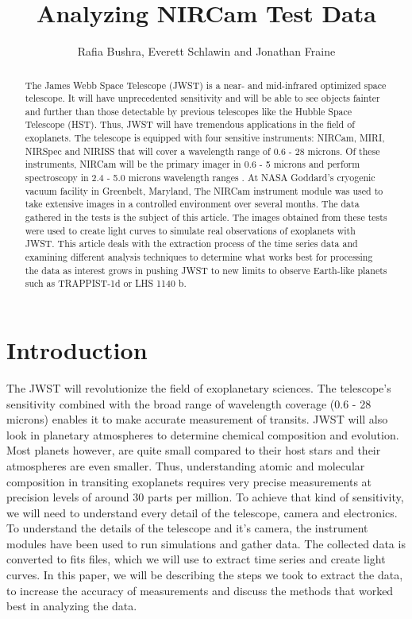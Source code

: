 \documentclass{aastex6}
\begin{document}
\title{Analyzing NIRCam Test Data}
\author{Rafia Bushra, Everett Schlawin and Jonathan Fraine}



\begin{abstract}
The James Webb Space Telescope (JWST) is a near- and mid-infrared optimized space telescope. It will have unprecedented sensitivity and will be able to see objects fainter and further than those detectable by previous telescopes like the Hubble Space Telescope (HST). Thus, JWST will have tremendous applications in the field of exoplanets. The telescope is equipped with four sensitive instruments: NIRCam, MIRI, NIRSpec and NIRISS that will cover a wavelength range of 0.6 - 28 microns. Of these instruments, NIRCam will be the primary imager in 0.6 - 5 microns and perform spectroscopy in 2.4 - 5.0 microns wavelength ranges . At NASA Goddard’s cryogenic vacuum facility in Greenbelt, Maryland, The NIRCam instrument module was used to take extensive images in a controlled environment over several months. The data gathered in the tests is the subject of this article. The images obtained from these tests were used to create light curves to simulate  real observations of exoplanets with JWST. This article deals with the extraction process of the time series data and examining different analysis techniques to determine what works best for processing the data as interest grows in pushing JWST to new limits to observe Earth-like planets such as TRAPPIST-1d or LHS 1140 b.
\end{abstract}



\section{Introduction}
The JWST will revolutionize the field of exoplanetary sciences. The telescope's sensitivity combined with the broad range of wavelength coverage (0.6 - 28 microns) enables it to make accurate measurement of transits. JWST will also look in planetary atmospheres to determine chemical composition and evolution. Most planets however, are quite small compared to their host stars and their atmospheres are even smaller. Thus, understanding atomic and molecular composition in transiting exoplanets requires very precise measurements at precision levels of around 30 parts per million. To achieve that kind of sensitivity, we will need to understand every detail of the telescope, camera and electronics.\\
To understand the details of the telescope and it's camera, the instrument modules have been used to run simulations and gather data. The collected data is converted to fits files, which we will use to extract time series and create light curves. In this paper, we will be describing the steps we took to extract the data, to increase the accuracy of measurements and discuss the methods that worked best in analyzing the data.   
\end{document}
